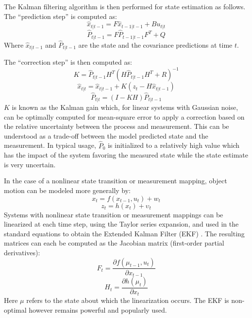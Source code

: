 \documentclass[a4paper,twoside,12pt]{report}
\begin{document}
The Kalman filtering algorithm is then performed for state estimation as follows. The ``prediction step'' is computed as:
\begin{equation}
\hat{x}_{t|t-1}=F\hat{x}_{t-1|t-1}+Bu_{t|t}
\end{equation}
\begin{equation}
\hat{P}_{t|t-1}=F\hat{P}_{t-1|t-1}F^T+Q 
\end{equation}
Where $\hat{x}_{t|t-1}$ and $\hat{P}_{t|t-1}$ are the state and the covariance predictions at  time $t$. 

The ``correction step'' is then computed as:
\begin{equation} 
K = \hat{P}_{t|t-1}H^T(H\hat{P}_{t|t-1}H^T+R)^{-1}
\end{equation}
\begin{equation} 
\hat{x}_{t|t} = \hat{x}_{t|t-1}+K(z_t-H\hat{x}_{t|t-1})
\end{equation}
\begin{equation} 
\hat{P}_{t|t}=(I-KH)\hat{P}_{t|t-1}
\end{equation}
$K$ is known as the Kalman gain which, for linear systems with Gaussian noise, can be optimally computed for mean-square error to apply a correction based on the relative uncertainty between the process and measurement. This can be understood as a trade-off between the model predicted state and the measurement. In typical usage, $\hat{P}_0$ is initialized to a relatively high value which has the impact of the system favoring the measured state while the state estimate is very uncertain.

In the case of a nonlinear state transition or measurement mapping, object motion can be modeled more generally by:
\begin{equation} 
x_t=f(x_{t-1},u_{t})+w_{t}
\end{equation}
\begin{equation} 
z_t=h(x_{t})+{\upsilon}_t
\end{equation}
Systems with nonlinear state transition or measurement mappings can be linearized at each time step, using the Taylor series expansion, and used in the standard equations to obtain the Extended Kalman Filter (EKF) \citep{trackbook}. The resulting matrices can each be computed as the Jacobian matrix (first-order partial derivatives):
\begin{equation}
F_t = \frac{\partial f(\mu_{t-1}, u_{t})}{\partial x_{t-1}}
\end{equation}
\begin{equation} 
H_t = \frac{\partial h(\mu_{t})}{\partial x_t} 
\end{equation}
Here $\mu$ refers to the state about which the linearization occurs. The EKF is non-optimal however remains powerful and popularly used.
\end{document}
